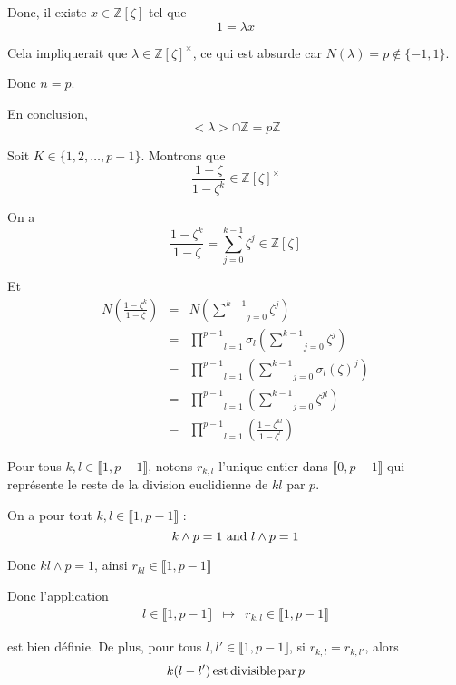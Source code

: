 Donc, il existe $x \in \mathbb{Z} [\zeta]$ tel que
\[ 1 = \lambda x \]


Cela impliquerait que $\lambda \in \mathbb{Z} [\zeta]^{\times}$, ce qui est
absurde car $N (\lambda) = p \nin \{ - 1, 1 \}$.

Donc $n = p$.

En conclusion,
\[ < \lambda > \cap \mathbb{Z}= p\mathbb{Z} \]


 Soit $K \in \{ 1, 2, \ldots, p - 1 \}$. Montrons que
\[ \frac{1 - \zeta}{1 - \zeta^k} \in \mathbb{Z} [\zeta]^{\times} \]


{}

On a
\[ \frac{1 - \zeta^k}{1 - \zeta} = \underset{j = 0}{\overset{k - 1}{\sum}}
   \zeta^j \in \mathbb{Z} [\zeta] \]


Et
\begin{eqnarray*}
  N \left( \frac{1 - \zeta^k}{1 - \zeta} \right) & = & N \left( \underset{j =
  0}{\overset{k - 1}{\sum}} \zeta^j \right)\\
  & = & \underset{l = 1}{\overset{p - 1}{\prod}} \sigma_l \left( \underset{j
  = 0}{\overset{k - 1}{\sum}} \zeta^j \right)\\
  & = & \underset{l = 1}{\overset{p - 1}{\prod}}  \left( \underset{j =
  0}{\overset{k - 1}{\sum}} \sigma_l (\zeta)^j \right)\\
  & = & \underset{l = 1}{\overset{p - 1}{\prod}}  \left( \underset{j =
  0}{\overset{k - 1}{\sum}} \zeta^{j l} \right)\\
  & = & \underset{l = 1}{\overset{p - 1}{\prod}}  \left( \frac{1 - \zeta^{k
  l}}{1 - \zeta^l} \right)
\end{eqnarray*}


Pour tous $k, l \in \llbracket 1, p - 1 \rrbracket$, notons $r_{k, l}$
l'unique entier dans $\llbracket 0, p - 1 \rrbracket$ qui repr{\'e}sente le
reste de la division euclidienne de $k l$ par $p$.

On a pour tout $k, l \in \llbracket 1, p - 1 \rrbracket$ :
\[ k \wedge p = 1 \text{ and } l \wedge p = 1 \]


Donc $k l \wedge p = 1$, ainsi $r_{k l} \in \llbracket 1, p - 1 \rrbracket$

Donc l'application
\[ \begin{array}{lll}
     l \in \llbracket 1, p - 1 \rrbracket & \longmapsto & r_{k, l} \in
     \llbracket 1, p - 1 \rrbracket
   \end{array} \]


est bien d{\'e}finie. De plus, pour tous $l, l' \in \llbracket 1, p - 1
\rrbracket$, si $r_{k, l} = r_{k, l'}$, alors
\[ k (l - l') \operatorname{est} \operatorname{divisible} \operatorname{par} p \]


